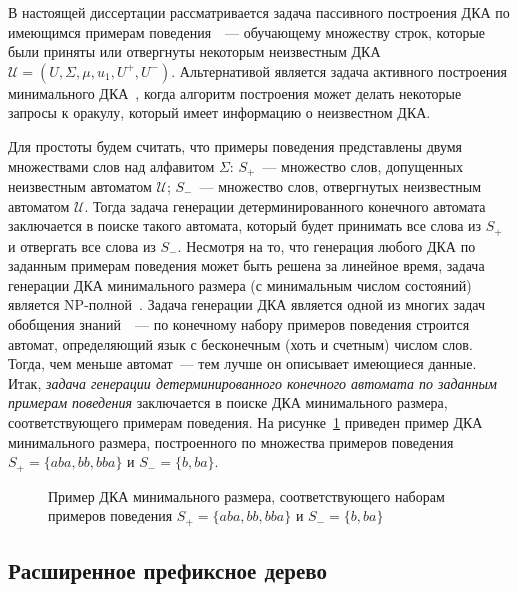 В настоящей диссертации рассматривается задача пассивного построения ДКА по имеющимся примерам поведения~\cite{DBLP:journals/pr/BugalhoO05,DBLP:journals/pr/Higuera05}~--- обучающему множеству строк, которые были приняты или отвергнуты некоторым неизвестным ДКА $\mathcal{U} = \left(U,\Sigma,\mu,u_{1},U^{+},U^{-}\right)$. 
Альтернативой является задача активного построения минимального ДКА~\cite{Angluin-active-87,DBLP:conf/sfm/SteffenHM11,neider-phd-14}, когда алгоритм построения может делать некоторые запросы к оракулу, который имеет информацию о неизвестном ДКА.

Для простоты будем считать, что примеры поведения представлены двумя множествами слов над алфавитом $\Sigma$: $S_{+}$~--- множество слов, допущенных неизвестным автоматом $\mathcal{U}$; $S_{-}$~--- множество слов, отвергнутых неизвестным автоматом $\mathcal{U}$.
Тогда задача генерации детерминированного конечного автомата заключается в поиске такого автомата, который будет принимать все слова из $S_{+}$ и отвергать все слова из $S_{-}$.
Несмотря на то, что генерация любого ДКА по заданным примерам поведения может быть решена за линейное время, задача генерации ДКА минимального размера (с минимальным числом состояний) является NP-полной~\cite{DBLP:journals/iandc/Gold78}.
Задача генерации ДКА является одной из многих задач обобщения знаний~\cite{banich2011generalization}~--- по конечному набору примеров поведения строится автомат, определяющий язык с бесконечным (хоть и счетным) числом слов.
Тогда, чем меньше автомат~--- тем лучше он описывает имеющиеся данные.
Итак, \emph{задача генерации детерминированного конечного автомата по заданным примерам поведения} заключается в поиске ДКА минимального размера, соответствующего примерам поведения.
На рисунке~\ref{img:dfa-ex} приведен пример ДКА минимального размера, построенного по множества примеров поведения $S_{+} = \{aba, bb, bba\}$ и $S_{-} = \{b, ba\}$. 

\begin{figure}[ht]
  \centering
  \ifafour
    
  \else
    
  \fi
  \caption{Пример ДКА минимального размера, соответствующего наборам примеров поведения $S_{+} = \{aba, bb, bba\}$ и $S_{-} = \{b, ba\}$}
  \label{img:dfa-ex}
\end{figure}

\subsection{Расширенное префиксное дерево}
\label{sec:review:dfa-inf:apta}

